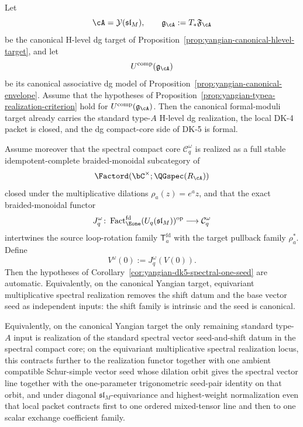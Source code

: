 \begin{corollary}
\label{cor:yangian-canonical-realization-to-spectral-seed}
Let
\[
\cA=\mathcal{Y}(\mathfrak{sl}_M),
\qquad
\mathfrak{g}_{\cA}:=T_*\mathfrak{F}_{\cA}
\]
be the canonical H-level dg target of
Proposition~\ref{prop:yangian-canonical-hlevel-target}, and let
\[
U^{\mathrm{comp}}(\mathfrak{g}_{\cA})
\]
be its canonical associative dg model of
Proposition~\ref{prop:yangian-canonical-envelope}.  Assume that the
hypotheses of Proposition~\ref{prop:yangian-typea-realization-criterion}
hold for \(U^{\mathrm{comp}}(\mathfrak{g}_{\cA})\).  Then the canonical
formal-moduli target already carries the standard type-$A$ H-level dg
realization, the local DK-4 packet is closed, and the dg compact-core
side of DK-5 is formal.

Assume moreover that the spectral compact core \(\mathcal C_q^\omega\)
is realized as a full stable idempotent-complete braided-monoidal
subcategory of
\[
\Factord(\bC^\times;\QGspec(R_{\cA}))
\]
closed under the multiplicative dilations
\(\rho_a(z)=e^a z\), and that the exact braided-monoidal functor
\[
J_q^\omega\colon
\operatorname{Fact}_{\Eone}^{\mathrm{fd}}(U_q(\mathfrak{sl}_M))^{\mathrm{op}}
\longrightarrow
\mathcal C_q^\omega
\]
intertwines the source loop-rotation family
\(\mathsf T_a^{\mathrm{fd}}\) with the target pullback family
\(\rho_a^*\).  Define
\[
V^\omega(0):=J_q^\omega(V(0)).
\]
Then the hypotheses of
Corollary~\ref{cor:yangian-dk5-spectral-one-seed} are automatic.
Equivalently, on the canonical Yangian target, equivariant
multiplicative spectral realization removes the shift datum and the
base vector seed as independent inputs: the shift family is intrinsic
and the seed is canonical.

Equivalently, on the canonical Yangian target the only remaining
standard type-$A$ input is realization of the standard spectral vector
seed-and-shift datum in the spectral compact core; on the equivariant
multiplicative spectral realization locus, this contracts further to
the realization functor together with one ambient compatible
Schur-simple vector seed whose dilation orbit gives the spectral
vector line together with the one-parameter trigonometric seed-pair
identity on that orbit, and under diagonal
\(\mathfrak{sl}_M\)-equivariance and highest-weight normalization even
that local packet contracts first to one ordered mixed-tensor line and
then to one scalar exchange coefficient family.


\end{corollary}
